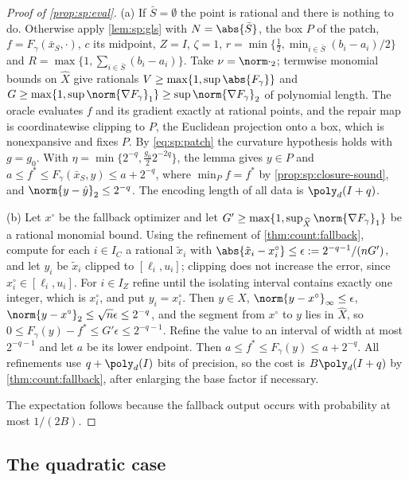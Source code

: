 \begin{proof}[Proof of \cref{prop:sp:eval}]
(a) If $\bar S=\emptyset$ the point is rational and there is nothing to do.
Otherwise apply \cref{lem:sp:gls} with $N=\abs{\bar S}$, the box $P$ of the
patch, $f=F_\gamma(\bar x_S,\cdot)$, $c$ its midpoint, $Z=I$, $\zeta=1$,
$r=\min\{\frac12,\min_{i\in\bar S}(b_i-a_i)/2\}$ and
$R=\max\{1,\sum_{i\in\bar S}(b_i-a_i)\}$. Take $\nu=\norm\cdot_2$; termwise
monomial bounds on $\widehat X$ give rationals $V\ge\max\{1,\sup\abs{F_\gamma}\}$
and $G\ge\max\{1,\sup\norm{\nabla F_\gamma}_1\}\ge\sup\norm{\nabla
F_\gamma}_2$ of polynomial length. The oracle evaluates $f$ and its
gradient exactly at rational points, and the repair map is coordinatewise
clipping to $P$, the Euclidean projection onto a box, which is nonexpansive
and fixes $P$. By \eqref{eq:sp:patch} the curvature hypothesis holds with
$g=g_0$. With $\eta=\min\{2^{-q},\frac{g_0}22^{-2q}\}$, the lemma gives
$y\in P$ and $a\le f^*\le F_\gamma(\bar x_S,y)\le a+2^{-q}$, where
$\min_Pf=f^*$ by \cref{prop:sp:closure-sound}, and $\norm{y-\hat y}_2\le
2^{-q}$. The encoding length of all data is $\poly_d(I+q)$.

(b) Let $x^\circ$ be the fallback optimizer and let
$G'\ge\max\{1,\sup_{\widehat X}\norm{\nabla F_\gamma}_1\}$ be a rational
monomial bound. Using the refinement of \cref{thm:count:fallback}, compute
for each $i\in I_C$ a rational $\tilde x_i$ with
$\abs{\tilde x_i-x_i^\circ}\le\epsilon:=2^{-q-1}/(nG')$, and let $y_i$ be
$\tilde x_i$ clipped to $[\ell_i,u_i]$; clipping does not increase the error,
since $x^\circ_i\in[\ell_i,u_i]$. For $i\in I_Z$ refine until the isolating
interval contains exactly one integer, which is $x_i^\circ$, and put
$y_i=x_i^\circ$. Then $y\in X$, $\norm{y-x^\circ}_\infty\le\epsilon$,
$\norm{y-x^\circ}_2\le\sqrt n\epsilon\le2^{-q}$, and the segment from $x^\circ$
to $y$ lies in $\widehat X$, so
$0\le F_\gamma(y)-f^*\le G'\epsilon\le2^{-q-1}$. Refine the value to an
interval of width at most $2^{-q-1}$ and let $a$ be its lower endpoint. Then
$a\le f^*\le F_\gamma(y)\le a+2^{-q}$. All refinements use $q+\poly_d(I)$
bits of precision, so the cost is $B\poly_d(I+q)$ by
\cref{thm:count:fallback}, after enlarging the base factor if necessary.

The expectation follows because the fallback output occurs with probability
at most $1/(2B)$.
\end{proof}

\subsection{The quadratic case}\label{app:sp:qp}

